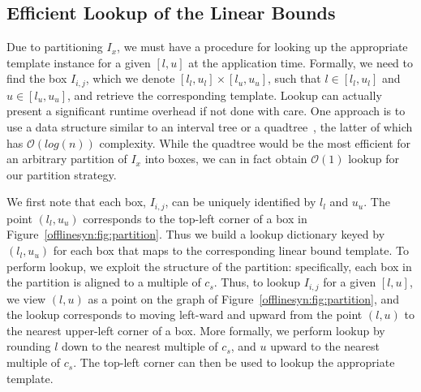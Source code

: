 \subsection{Efficient Lookup of the Linear Bounds}

Due to partitioning $ I_x $, we must have a procedure for looking up the
appropriate template instance for a given $ [l, u] $ at the application time.
Formally, we need to find the box
$ I_{i, j} $, which we denote $ [l_l, u_l] \times [l_u, u_u] $,
such that $ l \in [l_l, u_l] $ and $ u \in [l_u, u_u] $, and retrieve the
corresponding template. Lookup can actually present a significant runtime overhead if
not done with care. One approach is to use a data structure similar to an interval
tree or a quadtree~\cite{finkel1974quad}, the latter of which has $
\mathcal{O}(log(n)) $ complexity. While the quadtree would be the most
efficient for an arbitrary partition of $ I_x $ into boxes, we can in fact
obtain $ \mathcal{O}(1) $ lookup for our partition strategy.

We first note that each box, $ I_{i, j} $,
can be uniquely identified by $ l_l $ and $ u_u $. The point $ (l_l, u_u) $
corresponds to the top-left corner of a box in
Figure~\ref{offlinesyn:fig:partition}.
%
Thus we build a lookup dictionary keyed by $ (l_l, u_u) $ for each box that
maps to the corresponding linear bound template.
%
To perform lookup, we exploit the structure of the partition: specifically,
each box in the partition is aligned to a multiple of $ c_s $.
%
Thus, to lookup $ I_{i,j} $ for a given $ [l, u] $, we view $ (l, u) $ as a
point on the graph of Figure~\ref{offlinesyn:fig:partition}, and the lookup
corresponds to
moving left-ward and upward from the point $ (l, u) $ to the nearest upper-left
corner of a box.
%
More formally, we perform lookup by rounding $ l $ down to the nearest
multiple of $ c_s $, and $ u $ upward to the nearest multiple of $ c_s $.
The top-left corner can then be used to lookup the appropriate template.



